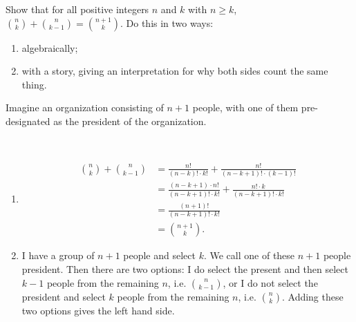 
\setcounter{theorem}{11}
\begin{exercise}[BH.1.16]
	Show that for all positive integers $n$ and $k$ with $n \geq k$, $\binom{n}{k} + \binom{n}{k - 1} = \binom{n + 1}{k}$. Do this in two ways: 
	\begin{enumerate}
		\item algebraically;
		\item with a story, giving an interpretation for why both sides count the same thing.
	\end{enumerate}
\begin{hint}
	Imagine an organization consisting of $n + 1$ people, with one of them pre-designated as the president of the organization.
\end{hint}
\begin{solution}~
	\begin{enumerate}
		\item \begin{align*}
	 		{n \choose k} + {n \choose k-1} &= \frac{n!}{(n-k)!\cdot k!} + \frac{n!}{(n-k+1)!\cdot (k-1)!}\\
	 		&= \frac{(n-k+1)\cdot n!}{(n-k+1)!\cdot k!} +  \frac{n!\cdot k}{(n-k+1)!\cdot k!}\\
	 		& = \frac{(n+1)!}{(n-k+1)!\cdot k!}\\
	 		& = {n+1\choose k}.
	 	\end{align*}
	 	\item I have a group of $n+1$ people and select $k$. We call one of these $n+1$ people president. Then there are two options: I do select the present and then select $k-1$ people from the remaining $n$, i.e. ${n \choose k-1}$, or I do not select the president and select $k$ people from the remaining $n$, i.e. ${n \choose k}$. Adding these two options gives the left hand side.
	\end{enumerate}
\end{solution}
\end{exercise}


